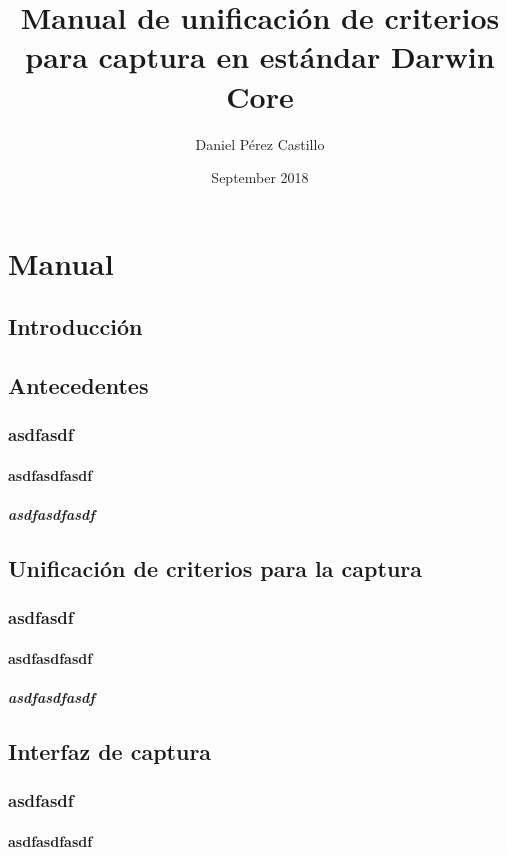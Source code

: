 \documentclass{book}
\title{Manual de unificación de criterios para captura en estándar Darwin Core}
\author{Daniel Pérez Castillo }
\date{September 2018}
\begin{document}
\maketitle
\chapter{Manual}
\section{Introducción}

\section{Antecedentes}
    \subsection{asdfasdf}
        \subsubsection{asdfasdfasdf}
            \paragraph{asdfasdfasdf}
\section{Unificación de criterios para la captura}
    \subsection{asdfasdf}
        \subsubsection{asdfasdfasdf}
            \paragraph{asdfasdfasdf}
\section{Interfaz de captura}
    \subsection{asdfasdf}
        \subsubsection{asdfasdfasdf}
\end{document}
